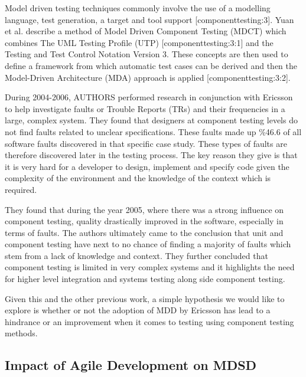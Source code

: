 \documentclass[fina_report_innit.tex]{subfiles}
\begin{document}
Model driven testing techniques commonly involve the use of a modelling language, test generation, a target and tool support [componenttesting:3]. Yuan et al. describe a method of Model Driven Component Testing (MDCT) which combines The UML Testing Profile (UTP) [componenttesting:3:1] and the Testing and Test Control Notation Version 3. These concepts are then used to define a framework from which automatic test cases can be derived and then the Model-Driven Architecture (MDA) approach is applied [componenttesting:3:2]. 

During 2004-2006, AUTHORS performed research in conjunction with Ericsson to help investigate faults or Trouble Reports (TRs) and their frequencies in a large, complex system. They found that designers at component testing levels do not find faults related to unclear specifications. These faults made up \%46.6 of all software faults discovered in that specific case study. These types of faults are therefore discovered later in the testing process. The key reason they give is that it is very hard for a developer to design, implement and specify code given the complexity of the environment and the knowledge of the context which is required. 

They found that during the year 2005, where there was a strong influence on component testing, quality drastically improved in the software, especially in terms of faults. The authors ultimately came to the conclusion that unit and component testing have next to no chance of finding a majority of faults which stem from a lack of knowledge and context. They further concluded that component testing is limited in very complex systems and it highlights the need for higher level integration and systems testing along side component testing.

Given this and the other previous work, a simple hypothesis we would like to explore is whether or not the adoption of MDD by Ericsson has lead to a hindrance or an improvement when it comes to testing using component testing methods.

\subsection*{Impact of Agile Development on MDSD}
\end{document}
